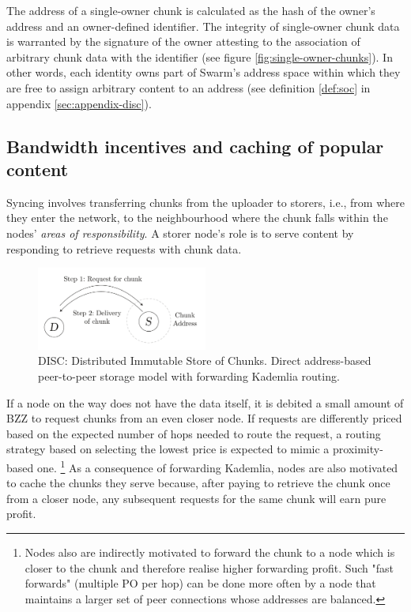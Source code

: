 The address of a single-owner chunk is calculated as the hash of the owner’s address and an owner-defined identifier. The integrity of single-owner chunk data is warranted by the signature of the owner attesting to the association of arbitrary chunk data with the identifier (see figure \ref{fig:single-owner-chunks}). In other words, each identity owns part of Swarm's address space within which they are free to assign arbitrary content to an address (see definition \ref{def:soc} in appendix \ref{sec:appendix-disc}).



\subsection{Bandwidth incentives and caching of popular content}


Syncing involves transferring chunks from the uploader to storers, i.e., from where they enter the network, to the neighbourhood where the chunk falls within the nodes' \emph{areas of responsibility}. A storer node's role is to serve content by responding to retrieve requests with chunk data.

\begin{figure}[!th]
  \centering \includegraphics[width=0.5\textwidth]{fig/disc.pdf}
  \caption[DISC]{DISC: Distributed Immutable Store of Chunks. Direct address-based peer-to-peer storage model with forwarding Kademlia routing.}
\label{fig:disc}
\end{figure}


If a node on the way does not have the data itself, it is debited a small amount of BZZ to request chunks from an even closer node. If requests are differently priced based on the expected number of hops needed to route the request, a routing strategy based on selecting the lowest price is expected to mimic a proximity-based one.%
%
\footnote{Nodes also are indirectly motivated to forward the chunk to a node which is closer to the chunk and therefore realise higher forwarding profit. Such "fast forwards" (multiple PO per hop) can be done more often by a node that maintains a larger set of peer connections whose addresses are balanced.}
%
As a consequence of forwarding Kademlia, nodes are also motivated to cache the chunks they serve because, after paying to retrieve the chunk once from a closer node, any subsequent requests for the same chunk will earn pure profit. 

